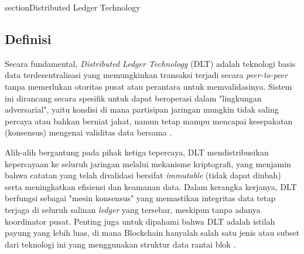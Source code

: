 section{Distributed Ledger Technology}

\subsection{Definisi}
Secara fundamental, \textit{Distributed Ledger Technology} (DLT) adalah teknologi basis data terdesentralisasi yang memungkinkan transaksi terjadi secara \textit{peer-to-peer} tanpa memerlukan otoritas pusat atau perantara untuk memvalidasinya. Sistem ini dirancang secara spesifik untuk dapat beroperasi dalam "lingkungan adversarial", yaitu kondisi di mana partisipan jaringan mungkin tidak saling percaya atau bahkan berniat jahat, namun tetap mampu mencapai kesepakatan (konsensus) mengenai validitas data bersama \cite{16}.

Alih-alih bergantung pada pihak ketiga tepercaya, DLT mendistribusikan kepercayaan ke seluruh jaringan melalui mekanisme kriptografi, yang menjamin bahwa catatan yang telah divalidasi bersifat \textit{immutable} (tidak dapat diubah) serta meningkatkan efisiensi dan keamanan data. Dalam kerangka kerjanya, DLT berfungsi sebagai "mesin konsensus" yang memastikan integritas data tetap terjaga di seluruh salinan \textit{ledger} yang tersebar, meskipun tanpa adanya koordinator pusat. Penting juga untuk dipahami bahwa DLT adalah istilah payung yang lebih luas, di mana Blockchain hanyalah salah satu jenis atau subset dari teknologi ini yang menggunakan struktur data rantai blok \cite{16}.